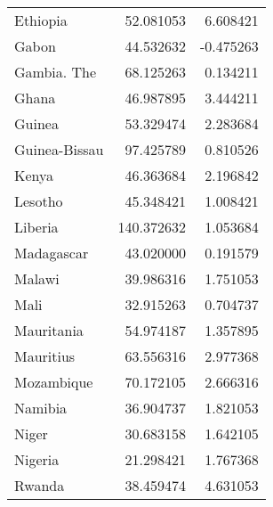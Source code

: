 \begin{tabular}{lrr}
Ethiopia                 &                       52.081053 &                              6.608421 \\
Gabon                    &                       44.532632 &                             -0.475263 \\
Gambia. The              &                       68.125263 &                              0.134211 \\
Ghana                    &                       46.987895 &                              3.444211 \\
Guinea                   &                       53.329474 &                              2.283684 \\
Guinea-Bissau            &                       97.425789 &                              0.810526 \\
Kenya                    &                       46.363684 &                              2.196842 \\
Lesotho                  &                       45.348421 &                              1.008421 \\
Liberia                  &                      140.372632 &                              1.053684 \\
Madagascar               &                       43.020000 &                              0.191579 \\
Malawi                   &                       39.986316 &                              1.751053 \\
Mali                     &                       32.915263 &                              0.704737 \\
Mauritania               &                       54.974187 &                              1.357895 \\
Mauritius                &                       63.556316 &                              2.977368 \\
Mozambique               &                       70.172105 &                              2.666316 \\
Namibia                  &                       36.904737 &                              1.821053 \\
Niger                    &                       30.683158 &                              1.642105 \\
Nigeria                  &                       21.298421 &                              1.767368 \\
Rwanda                   &                       38.459474 &                              4.631053 \\

\end{tabular}

